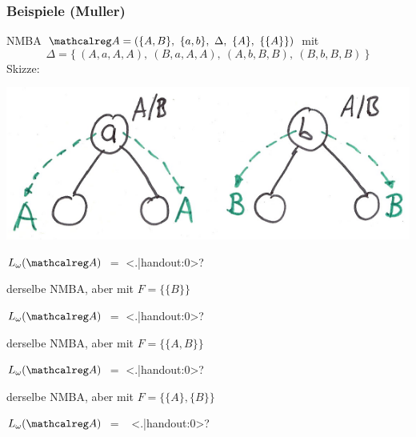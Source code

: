 \begin{frame}
  \frametitle{Beispiele (Muller)}
  \label{fra:beispiele_muller}

  \begin{Itemize}
    \item<+->
      NMBA $\Aut{A}=(\{A,B\},~\{a,b\},~\Delta,~\{A\},~\{\{A\}\})$ mit %
      \[
        \Delta = \{~(A,a,A,A),~(B,a,A,A),~(A,b,B,B),~(B,b,B,B)~\}
      \]
      Skizze:
      \par\vspace*{-1.4\baselineskip}
      \begin{center}
        \includegraphics[scale=.45]{img/beispielautomaten_1.pdf}
      \end{center}

      \par\vspace*{-.4\baselineskip}
      $L_\omega(\Aut{A})$ $=$
      \only<.|handout:0>{?}%
      \par\medskip
    \item<+->
      derselbe NMBA, aber mit $F=\{\{B\}\}$
      \par\smallskip
      $L_\omega(\Aut{A})$ $=$
      \only<.|handout:0>{?}%
      \par\medskip
    \item<+->
      derselbe NMBA, aber mit $F=\{\{A,B\}\}$
      \par\smallskip
      $L_\omega(\Aut{A})$ $=$
      \only<.|handout:0>{?}%
      \par\medskip
    \item<+->
      derselbe NMBA, aber mit $F=\{\{A\},\{B\}\}$
      \par\smallskip
      $L_\omega(\Aut{A})$ $=$
      \mbox{%
        \only<.|handout:0>{?}%
        \hspace*{-5mm}%
      }
  \end{Itemize}

\end{frame}
  
